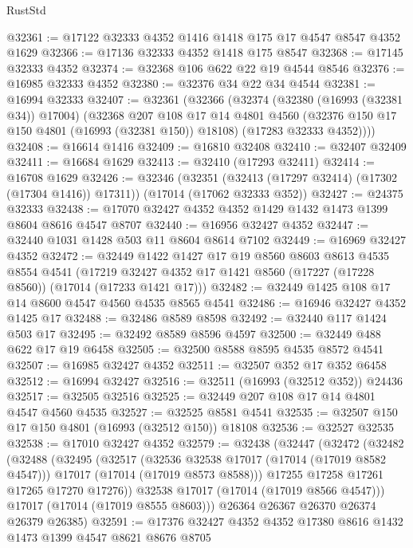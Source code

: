 \begin{lexlean}{RustStd}
\begin{coremodule}
@32361 := @17122 @32333 @4352 @1416 @1418 @175 @17 @4547 @8547 @4352 @1629
@32366 := @17136 @32333 @4352 @1418 @175 @8547
@32368 := @17145 @32333 @4352
@32374 := @32368 @106 @622 @22 @19 @4544 @8546
@32376 := @16985 @32333 @4352
@32380 := @32376 @34 @22 @34 @4544
@32381 := @16994 @32333
@32407 := @32361
    (@32366
      (@32374
        (@32380 (@16993 (@32381 @34)) @17004)
        (@32368
          @207
          @108
          @17
          @14
          @4801
          @4560
          (@32376 @150 @17 @150 @4801 (@16993 (@32381 @150)) @18108)
          (@17283 @32333 @4352))))
@32408 := @16614 @1416
@32409 := @16810 @32408
@32410 := @32407 @32409
@32411 := @16684 @1629
@32413 := @32410 (@17293 @32411)
@32414 := @16708 @1629
@32426 := @32346
    (@32351 (@32413 (@17297 @32414) (@17302 (@17304 @1416)) @17311))
    (@17014 (@17062 @32333 @352))
@32427 := @24375 @32333
@32438 := @17070 @32427 @4352 @4352 @1429 @1432 @1473 @1399 @8604 @8616 @4547 @8707
@32440 := @16956 @32427 @4352
@32447 := @32440 @1031 @1428 @503 @11 @8604 @8614 @7102
@32449 := @16969 @32427 @4352
@32472 := @32449
    @1422
    @1427
    @17
    @19
    @8560
    @8603
    @8613
    @4535
    @8554
    @4541
    (@17219 @32427 @4352 @17 @1421 @8560 (@17227 (@17228 @8560)) (@17014 (@17233 @1421 @17)))
@32482 := @32449 @1425 @108 @17 @14 @8600 @4547 @4560 @4535 @8565 @4541
@32486 := @16946 @32427 @4352 @1425 @17
@32488 := @32486 @8589 @8598
@32492 := @32440 @117 @1424 @503 @17
@32495 := @32492 @8589 @8596 @4597
@32500 := @32449 @488 @622 @17 @19 @6458
@32505 := @32500 @8588 @8595 @4535 @8572 @4541
@32507 := @16985 @32427 @4352
@32511 := @32507 @352 @17 @352 @6458
@32512 := @16994 @32427
@32516 := @32511 (@16993 (@32512 @352)) @24436
@32517 := @32505 @32516
@32525 := @32449 @207 @108 @17 @14 @4801 @4547 @4560 @4535
@32527 := @32525 @8581 @4541
@32535 := @32507 @150 @17 @150 @4801 (@16993 (@32512 @150)) @18108
@32536 := @32527 @32535
@32538 := @17010 @32427 @4352
@32579 := @32438
    (@32447
      (@32472
        (@32482
          (@32488
            (@32495
              (@32517
                (@32536 @32538 @17017 (@17014 (@17019 @8582 @4547)))
                @17017
                (@17014 (@17019 @8573 @8588)))
              @17255
              @17258
              @17261
              @17265
              @17270
              @17276))
          @32538
          @17017
          (@17014 (@17019 @8566 @4547)))
        @17017
        (@17014 (@17019 @8555 @8603)))
      @26364
      @26367
      @26370
      @26374
      @26379
      @26385)
@32591 := @17376 @32427 @4352 @4352 @17380 @8616 @1432 @1473 @1399 @4547 @8621 @8676 @8705

\end{coremodule}
\end{lexlean}
